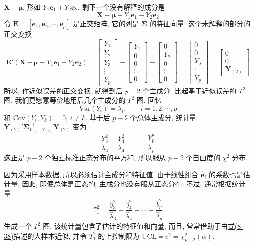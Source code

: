 
$\mathbf{X}-\boldsymbol{\mu}$, 形如 $Y_1\mathbf{e}_1+Y_2\mathbf{e}_2$. 剩下一个没有解释的成分是
\[
\mathbf{X}-\boldsymbol{\mu}-Y_1\mathbf{e}_1-Y_2\mathbf{e}_2
\]
令 $\mathbf{E}=[\mathbf{e}_1,\mathbf{e}_2,\cdots,\mathbf{e}_p]$ 是正交矩阵, 它的列是 $\boldsymbol{\Sigma}$ 的特征向量. 这个未解释的部分的正交变换
\[
\mathbf{E}'(\mathbf{X}-\boldsymbol{\mu}-Y_1\mathbf{e}_1-Y_2\mathbf{e}_2)=
\begin{bmatrix}Y_1\\Y_2\\Y_3\\\vdots\\Y_p\end{bmatrix}-
\begin{bmatrix}Y_1\\0\\0\\\vdots\\0\end{bmatrix}-
\begin{bmatrix}0\\Y_2\\0\\\vdots\\0\end{bmatrix}=
\begin{bmatrix}0\\0\\Y_3\\\vdots\\Y_p\end{bmatrix}=
\begin{bmatrix}0\\0\\\mathbf{Y}_{(2)}\end{bmatrix}
\]
所以, 作近似误差的正交变换, 就得到后 $p-2$ 个主成分. 比起基于近似误差的 $T^2$ 图, 我们更愿意等价地用后几个主成分的 $T^2$ 图. 回忆
\[
\mathrm{Var}(Y_i)=\lambda_i,\qquad i=1,2,\cdots,p
\]
和 $\mathrm{Cov}(Y_i,Y_k)=0$, $i\neq k$. 基于后 $p-2$ 个总体主成分, 统计量 $\mathbf{Y}_{(2)}'\boldsymbol{\Sigma}_{Y_{(2)},Y_{(2)}}^{-1}\mathbf{Y}_{(2)}$ 变为
\label{eq:8-38}
\begin{equation}
\frac{Y_3^2}{\lambda_3}+\frac{Y_4^2}{\lambda_4}+\cdots+\frac{Y_p^2}{\lambda_p} \tag{8-38}
\end{equation}
这正是 $p-2$ 个独立标准正态分布的平方和, 所以服从 $p-2$ 个自由度的 $\chi^2$ 分布.

因为采用样本数据, 所以必须估计主成分和特征值. 由于线性组合 $\hat{\mathbf{e}}_i$ 的系数也是估计量, 因此, 即便总体是正态的, 主成分也没有服从正态分布. 不过, 通常根据统计量
\[
T_1^2=\frac{\hat{y}_3^2}{\hat{\lambda}_3}+\frac{\hat{y}_4^2}{\hat{\lambda}_4}+\cdots+\frac{\hat{y}_p^2}{\hat{\lambda}_p}
\]
生成一个 $T^2$ 图. 该统计量包含了估计的特征值和向量, 而且, 常常借助于由\hyperref[eq:8-38]{式(8-38)}描述的大样本近似, 并令 $T_1^2$ 的上控制限为 $\mathrm{UCL}=c^2=\chi_{p-2}^2(\alpha)$.

